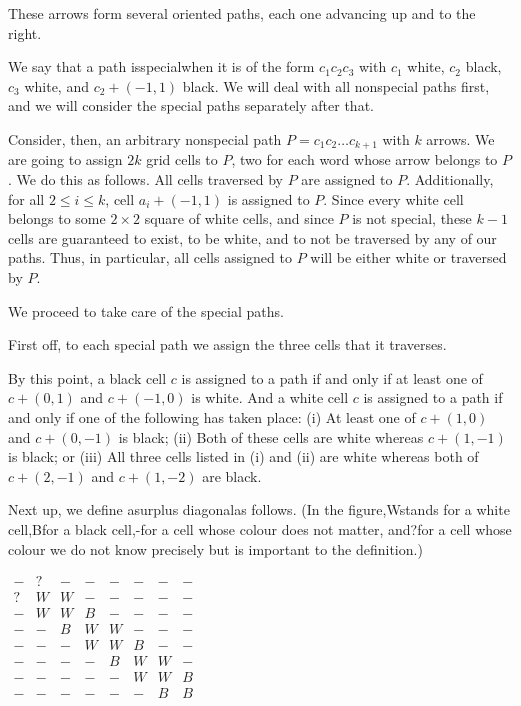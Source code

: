 \documentclass{article}
\begin{document}
These arrows form several oriented paths, each one advancing up and to the right.

We say that a path isspecialwhen it is of the form \(\displaystyle c_1c_2c_3\) with \(\displaystyle c_1\) white, \(\displaystyle c_2\) black, \(\displaystyle c_3\) white, and \(\displaystyle c_2 + (-1, 1)\) black. We will deal with all nonspecial paths first, and we will consider the special paths separately after that.

Consider, then, an arbitrary nonspecial path \(\displaystyle P = c_1 c_2 \ldots c_{k + 1}\) with \(\displaystyle k\) arrows. We are going to assign \(\displaystyle 2k\) grid cells to \(\displaystyle P\), two for each word whose arrow belongs to \(\displaystyle P\). We do this as follows. All cells traversed by \(\displaystyle P\) are assigned to \(\displaystyle P\). Additionally, for all \(\displaystyle 2 \le i \le k\), cell \(\displaystyle a_i + (-1, 1)\) is assigned to \(\displaystyle P\). Since every white cell belongs to some \(\displaystyle 2 \times 2\) square of white cells, and since \(\displaystyle P\) is not special, these \(\displaystyle k - 1\) cells are guaranteed to exist, to be white, and to not be traversed by any of our paths. Thus, in particular, all cells assigned to \(\displaystyle P\) will be either white or traversed by \(\displaystyle P\).

We proceed to take care of the special paths.

First off, to each special path we assign the three cells that it traverses.

By this point, a black cell \(\displaystyle c\) is assigned to a path if and only if at least one of \(\displaystyle c + (0, 1)\) and \(\displaystyle c + (-1, 0)\) is white. And a white cell \(\displaystyle c\) is assigned to a path if and only if one of the following has taken place: (i) At least one of \(\displaystyle c + (1, 0)\) and \(\displaystyle c + (0, -1)\) is black; (ii) Both of these cells are white whereas \(\displaystyle c + (1, -1)\) is black; or (iii) All three cells listed in (i) and (ii) are white whereas both of \(\displaystyle c + (2, -1)\) and \(\displaystyle c + (1, -2)\) are black.

Next up, we define asurplus diagonalas follows. (In the figure,Wstands for a white cell,Bfor a black cell,-for a cell whose colour does not matter, and?for a cell whose colour we do not know precisely but is important to the definition.)

\(\displaystyle \begin{matrix}
     - & ? & - & - & - & - & - & -\\
     ? & W & W & - & - & - & - & -\\
     - & W & W & B & - &- &- &-\\
     -& -& B& W& W& -& -& -\\
     -& -& -& W& W& B& -& -\\
     -& -& -& -& B& W& W& -\\
     -& -& -& -& -& W& W& B\\
     -& -& -& -& -& -& B& B\\
\end{matrix}\)
\end{document}
